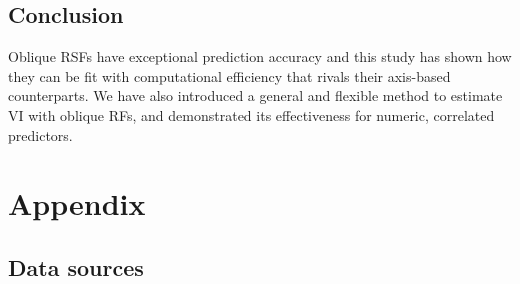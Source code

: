 \documentclass[12pt]{article}\usepackage[]{graphicx}\usepackage[]{xcolor}
\begin{document}
\subsection{Conclusion}

Oblique RSFs have exceptional prediction accuracy and this study has shown how they can be fit with computational efficiency that rivals their axis-based counterparts. We have also introduced a general and flexible method to estimate VI with oblique RFs, and demonstrated its effectiveness for numeric, correlated predictors.

\appendix

\section*{Appendix}
\captionsetup{labelformat=AppendixTables}
\setcounter{table}{0}

\subsection*{Data sources}
\end{document}
